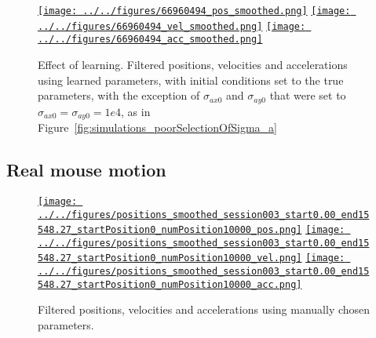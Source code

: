 \documentclass[12pt]{article}
\begin{document}
\begin{figure}
    \begin{center}

        \href{http://www.gatsby.ucl.ac.uk/~rapela/fwg/reports/learning/figures/66960494_pos_smoothed.html}{\texttt{[image: ../../figures/66960494\_pos\_smoothed.png]}}
        \href{http://www.gatsby.ucl.ac.uk/~rapela/fwg/reports/learning/figures/66960494_vel_smoothed.html}{\texttt{[image: ../../figures/66960494\_vel\_smoothed.png]}}
        \href{http://www.gatsby.ucl.ac.uk/~rapela/fwg/reports/learning/figures/66960494_acc_smoothed.html}{\texttt{[image: ../../figures/66960494\_acc\_smoothed.png]}}

        \caption{Effect of learning. Filtered positions, velocities and
        accelerations using learned parameters, with initial conditions set to
        the true parameters, with the exception of $\sigma_{ax0}$ and
        $\sigma_{ay0}$ that were set to $\sigma_{ax0}=\sigma_{ay0}=1e4$, as in
        Figure~\ref{fig:simulations_poorSelectionOfSigma_a} }

        \label{fig:simulations_effectOfLearning}

    \end{center}
\end{figure}

\subsection{Real mouse motion}

\begin{figure}
    \begin{center}

        \href{http://www.gatsby.ucl.ac.uk/~rapela/fwg/reports/learning/figures/positions_smoothed_session003_start0.00_end15548.27_startPosition0_numPosition10000_pos.html}{\texttt{[image: ../../figures/positions\_smoothed\_session003\_start0.00\_end15548.27\_startPosition0\_numPosition10000\_pos.png]}}
        \href{http://www.gatsby.ucl.ac.uk/~rapela/fwg/reports/learning/figures/positions_smoothed_session003_start0.00_end15548.27_startPosition0_numPosition10000_vel.html}{\texttt{[image: ../../figures/positions\_smoothed\_session003\_start0.00\_end15548.27\_startPosition0\_numPosition10000\_vel.png]}}
        \href{http://www.gatsby.ucl.ac.uk/~rapela/fwg/reports/learning/figures/positions_smoothed_session003_start0.00_end15548.27_startPosition0_numPosition10000_acc.html}{\texttt{[image: ../../figures/positions\_smoothed\_session003\_start0.00\_end15548.27\_startPosition0\_numPosition10000\_acc.png]}}

        \caption{Filtered positions, velocities and accelerations using
        manually chosen parameters.}

        \label{fig:real_manualParams}

    \end{center}
\end{figure}
\end{document}
